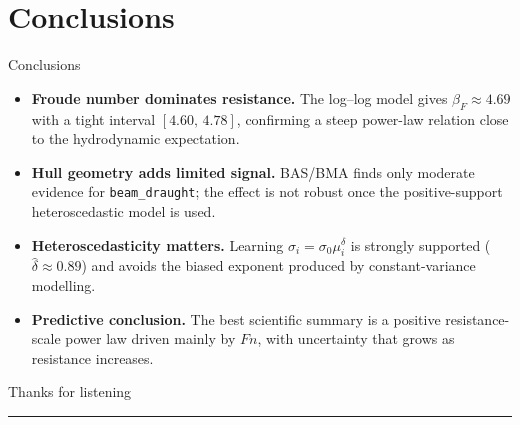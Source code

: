 \documentclass[11pt,aspectratio=169]{beamer}
\newcommand{\Fn}{\ensuremath{F\!n}}
\newcommand{\bF}{\ensuremath{\beta_F}}
\begin{document}
\section{Conclusions}

\begin{frame}{Conclusions}
	\small
	\begin{itemize}
		\setlength\itemsep{0.6em}
		\item \textbf{Froude number dominates resistance.} The log--log model gives
		      $\bF\approx4.69$ with a tight interval $[4.60,\,4.78]$, confirming a
		      steep power-law relation close to the hydrodynamic expectation.
		\item \textbf{Hull geometry adds limited signal.} BAS/BMA finds only moderate
		      evidence for \texttt{beam\_draught}; the effect is not robust once the
		      positive-support heteroscedastic model is used.
		\item \textbf{Heteroscedasticity matters.} Learning
		      $\sigma_i=\sigma_0\mu_i^{\delta}$ is strongly supported
		      ($\widehat\delta\approx0.89$) and avoids the biased exponent produced by
		      constant-variance modelling.
		\item \textbf{Predictive conclusion.} The best scientific summary is a positive
		      resistance-scale power law driven mainly by $\Fn$, with uncertainty that
		      grows as resistance increases.
	\end{itemize}
\end{frame}

\begin{frame}[plain]
	\centering
	\vspace*{\fill}
	{\LARGE Thanks for listening\par}
	\vspace{0.4em}
	{\color{PoliCyan}\rule{0.5\textwidth}{1pt}}
	\vspace*{\fill}
\end{frame}
\end{document}

